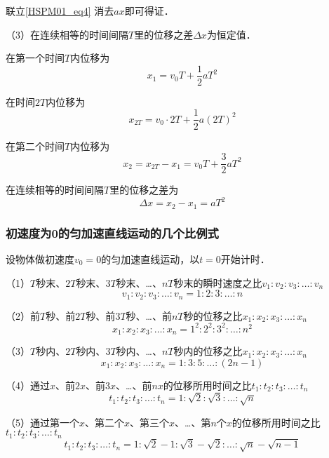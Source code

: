 联立\autoref{HSPM01_eq4} 消去$ax$即可得证．

（3）在连续相等的时间间隔$T$里的位移之差$\Delta x$为恒定值．

在第一个时间$T$内位移为
\begin{equation}
x_1=v_0T+\frac12aT^2
\end{equation}

在时间$2T$内位移为
\begin{equation}
x_{2T}=v_0\cdot2T+\frac12a(2T)^2
\end{equation}

在第二个时间$T$内位移为
\begin{equation}
x_2=x_{2T}-x_1=v_0T+\frac32aT^2
\end{equation}

在连续相等的时间间隔$T$里的位移之差为
\begin{equation}
\Delta x=x_2-x_1=aT^2
\end{equation}

\subsubsection{初速度为0的匀加速直线运动的几个比例式}
设物体做初速度$v_0=0$的匀加速直线运动，以$t=0$开始计时．

（1）$T$秒末、$2T$秒末、$3T$秒末、…、$nT$秒末的瞬时速度之比$v_1:v_2:v_3:\dots:v_n$
\begin{equation}
v_1:v_2:v_3:\dots:v_n=1:2:3:\dots:n
\end{equation}

（2）前$T$秒、前$2T$秒、前$3T$秒、…、前$nT$秒的位移之比$x_1:x_2:x_3:\dots:x_n$
\begin{equation}
x_1:x_2:x_3:\dots:x_n=1^2:2^2:3^2:\dots:n^2
\end{equation}

（3）$T$秒内、$2T$秒内、$3T$秒内、…、$nT$秒内的位移之比$x_1:x_2:x_3:\dots:x_n$
\begin{equation}
x_1:x_2:x_3:\dots:x_n=1:3:5:\dots:(2n-1)
\end{equation}

（4）通过$x$、前$2x$、前$3x$、…、前$nx$的位移所用时间之比$t_1:t_2:t_3:\dots:t_n$
\begin{equation}
t_1:t_2:t_3:\dots:t_n=1:\sqrt{2}:\sqrt{3}:\dots:\sqrt{n}
\end{equation}

（5）通过第一个$x$、第二个$x$、第三个$x$、…、第$n$个$x$的位移所用时间之比$t_1:t_2:t_3:\dots:t_n$
\begin{equation}
t_1:t_2:t_3:\dots:t_n=1:\sqrt{2}-1:\sqrt{3}-\sqrt{2}:\dots:\sqrt{n}-\sqrt{n-1}
\end{equation}

